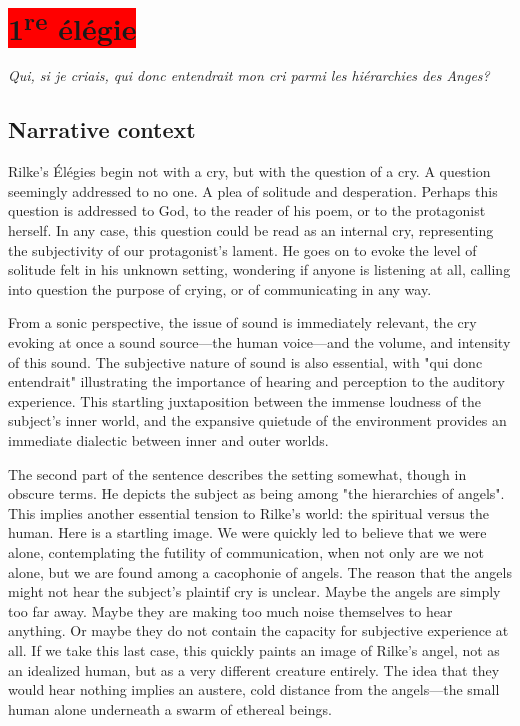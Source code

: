 \documentclass[12pt,twoside,maitrise]{dms_ks}
\theoremstyle{definition}
\begin{document}
{

\section{\colorbox{red}{1\textsuperscript{re} élégie}}

\epigraph{\textit{Qui, si je criais, qui donc entendrait mon cri parmi les hiérarchies des Anges?}}{}

\subsection{Narrative context}
Rilke's Élégies begin not with a cry, but with the question of a cry.
A question seemingly addressed to no one.
A plea of solitude and desperation.
Perhaps this question is addressed to God, to the reader of his poem, or to the protagonist herself.
In any case, this question could be read as an internal cry, representing the subjectivity of our protagonist's lament.
He goes on to evoke the level of solitude felt in his unknown setting, wondering if anyone is listening at all, calling into question the purpose of crying, or of communicating in any way.

From a sonic perspective, the issue of sound is immediately relevant, the cry evoking at once a sound source---the human voice---and the volume, and intensity of this sound.
The subjective nature of sound is also essential, with "qui donc entendrait" illustrating the importance of hearing and perception to the auditory experience.
This startling juxtaposition between the immense loudness of the subject's inner world, and the expansive quietude of the environment provides an immediate dialectic between inner and outer worlds.

The second part of the sentence describes the setting somewhat, though in obscure terms.
He depicts the subject as being among "the hierarchies of angels".
This implies another essential tension to Rilke's world: the spiritual versus the human.
Here is a startling image.
We were quickly led to believe that we were alone, contemplating the futility of communication, when not only are we not alone, but we are found among a cacophonie of angels.
The reason that the angels might not hear the subject's plaintif cry is unclear. 
Maybe the angels are simply too far away.
Maybe they are making too much noise themselves to hear anything.
Or maybe they do not contain the capacity for subjective experience at all.
If we take this last case, this quickly paints an image of Rilke's angel, not as an idealized human, but as a very different creature entirely.
The idea that they would hear nothing implies an austere, cold distance from the angels---the small human alone underneath a swarm of ethereal beings.

}
\end{document}
